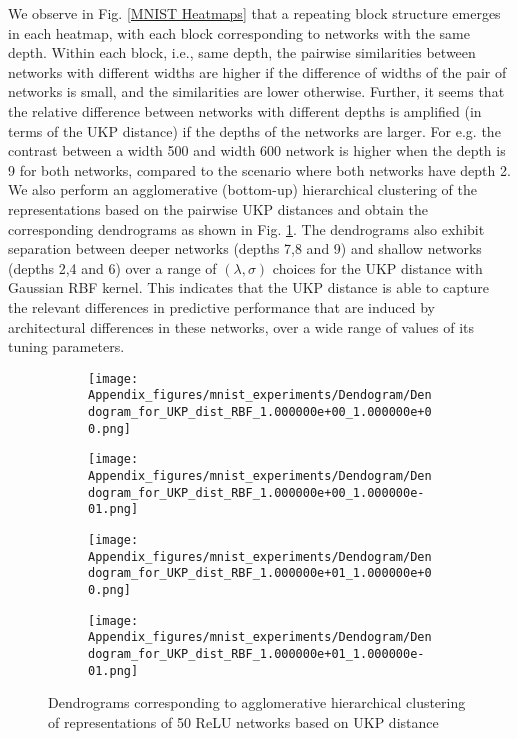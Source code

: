 \documentclass{article} %
\newcommand{\metricstname}{UKP }
\theoremstyle{plain}
\begin{document}
We observe in Fig. \ref{MNIST Heatmaps} that a repeating block structure emerges in each heatmap, with each block corresponding to networks with the same depth. Within each block, i.e., same depth, the pairwise similarities between networks with different widths are higher if the difference of widths of the pair of networks is small, and the similarities are lower otherwise. Further, it seems that the relative difference between networks with different depths is amplified (in terms of the \metricstname distance) if the depths of the networks are larger. For e.g. the contrast between a width 500 and width 600 network is higher when the depth is 9 for both networks, compared to the scenario where both networks have depth 2. We also perform an agglomerative (bottom-up) hierarchical clustering of the representations based on the pairwise \metricstname distances and obtain the corresponding dendrograms as shown in Fig. \ref{MNIST dendrograms}. The dendrograms also exhibit separation between deeper networks (depths 7,8 and 9) and shallow networks (depths 2,4 and 6) over a range of $(\lambda,\sigma)$ choices for the \metricstname distance with Gaussian RBF kernel. This indicates that the \metricstname distance is able to capture the relevant differences in predictive performance that are induced by architectural differences in these networks, over a wide range of values of its tuning parameters.

\begin{figure}[!h]
    \centering
    \begin{subfigure}[b]{0.45\textwidth}
        \texttt{[image: Appendix\_figures/mnist\_experiments/Dendogram/Dendogram\_for\_UKP\_dist\_RBF\_1.000000e+00\_1.000000e+00.png]}
    \end{subfigure}
    \hfill
    \begin{subfigure}[b]{0.45\textwidth}
        \texttt{[image: Appendix\_figures/mnist\_experiments/Dendogram/Dendogram\_for\_UKP\_dist\_RBF\_1.000000e+00\_1.000000e-01.png]}
    \end{subfigure}
    
    \vspace{0.5cm}  %
    
    \begin{subfigure}[b]{0.45\textwidth}
        \texttt{[image: Appendix\_figures/mnist\_experiments/Dendogram/Dendogram\_for\_UKP\_dist\_RBF\_1.000000e+01\_1.000000e+00.png]}
    \end{subfigure}
    \hfill
    \begin{subfigure}[b]{0.45\textwidth}
        \texttt{[image: Appendix\_figures/mnist\_experiments/Dendogram/Dendogram\_for\_UKP\_dist\_RBF\_1.000000e+01\_1.000000e-01.png]}
    \end{subfigure}
    
    \caption{Dendrograms corresponding to agglomerative hierarchical clustering of representations of 50 ReLU networks based on \metricstname distance}
    \label{MNIST dendrograms}
\end{figure}
\end{document}
